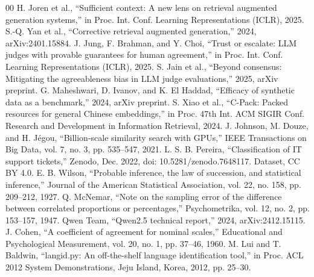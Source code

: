 \documentclass[conference,a4paper]{IEEEtran}
\begin{document}
\begin{thebibliography}{00}
 H. Joren et al., ``Sufficient context: A new lens on retrieval augmented generation systems,'' in Proc. Int. Conf. Learning Representations (ICLR), 2025.
 S.-Q. Yan et al., ``Corrective retrieval augmented generation,'' 2024, arXiv:2401.15884.
 J. Jung, F. Brahman, and Y. Choi, ``Trust or escalate: LLM judges with provable guarantees for human agreement,'' in Proc. Int. Conf. Learning Representations (ICLR), 2025.
 S. Jain et al., ``Beyond consensus: Mitigating the agreeableness bias in LLM judge evaluations,'' 2025, arXiv preprint.
 G. Maheshwari, D. Ivanov, and K. El Haddad, ``Efficacy of synthetic data as a benchmark,'' 2024, arXiv preprint.
 S. Xiao et al., ``C-Pack: Packed resources for general Chinese embeddings,'' in Proc. 47th Int. ACM SIGIR Conf. Research and Development in Information Retrieval, 2024.
 J. Johnson, M. Douze, and H. J\'{e}gou, ``Billion-scale similarity search with GPUs,'' IEEE Transactions on Big Data, vol. 7, no. 3, pp. 535--547, 2021.
 L. S. B. Pereira, ``Classification of IT support tickets,'' Zenodo, Dec. 2022, doi: 10.5281/zenodo.7648117. Dataset, CC BY 4.0.
 E. B. Wilson, ``Probable inference, the law of succession, and statistical inference,'' Journal of the American Statistical Association, vol. 22, no. 158, pp. 209--212, 1927.
 Q. McNemar, ``Note on the sampling error of the difference between correlated proportions or percentages,'' Psychometrika, vol. 12, no. 2, pp. 153--157, 1947.
 Qwen Team, ``Qwen2.5 technical report,'' 2024, arXiv:2412.15115.
 J. Cohen, ``A coefficient of agreement for nominal scales,'' Educational and Psychological Measurement, vol. 20, no. 1, pp. 37--46, 1960.
 M. Lui and T. Baldwin, ``langid.py: An off-the-shelf language identification tool,'' in Proc. ACL 2012 System Demonstrations, Jeju Island, Korea, 2012, pp. 25--30.
\end{thebibliography}
\end{document}
